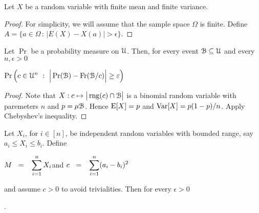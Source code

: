 \documentclass[sputnik.tex]{subfiles}
\begin{document}
\begin{void_thm}\label{Chebyshev}
Let $X$ be a random variable with finite mean and finite variance.

\end{void_thm}


\begin{proof}
For simplicity, we will assume that the sample space $\Omega$ is finite. Define $A=\{a\in\Omega\,:\, |E(X)-X(a)|>\epsilon\}$.





\end{proof}

\begin{void_thm}\label{wlln}
\def\ceq#1#2#3{\parbox[t]{45ex}{$\displaystyle #1$}\medrel{#2}{$\displaystyle #3$}}
Let $\Pr$ be a probability measure on $\EuScript U$.
Then, for every event $\EuScript B\subseteq\EuScript U$ and every $n,\epsilon>0$

\ceq{\hfill\Pr \Big(c\in\U^n\ :\ \Big|\Pr(\B) - \Fr(\B/c) \Big|\ge\epsilon\Big)}{\le}{\frac{1}{4n\epsilon^{\scriptscriptstyle 2}}}

\end{void_thm}


\begin{proof}
Note that $X:c\mapsto\big|\mathop{\rm rng}(c)\cap\EuScript B\big|$ is a binomial random variable with paremeters $n$ and $p=\mu\EuScript B$. 
Hence ${\rm E}[X]=p$ and  ${\rm Var}[X]=p(1-p)/n$.
Apply Chebyshev's inequality.
\end{proof}



\begin{void_thm}\label{Chebyshev}
Let $X_i$, for $i\in[n]$, be independent random variables with bounded range, say $a_i\le X_i\le b_i$.
Define

\hfil$\displaystyle M\medrel{=}\sum^n_{i=1}X_i$\hfil and \hfil $\displaystyle c\medrel{=}\sum^n_{i=1}(a_i-b_i)^2$

and assume $c>0$ to avoid trivialities. Then for every $\epsilon>0$ 

.
\end{void_thm}
\end{document}
